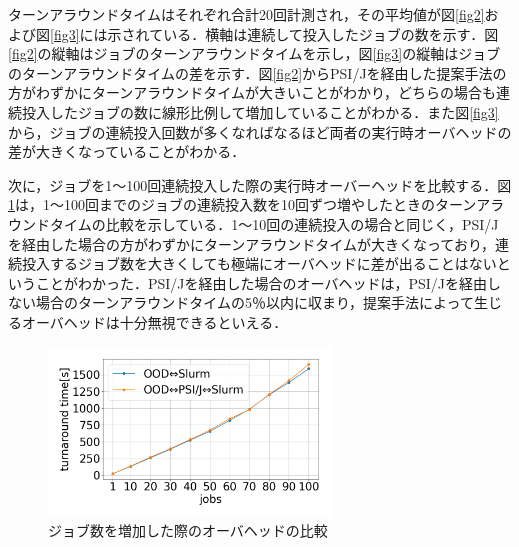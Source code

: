 \documentclass[a4paper,oneside,twocolumn,notitlepage,dvipdfmx]{jsarticle}
\begin{document}
\vspace{3\baselineskip}
ターンアラウンドタイムはそれぞれ合計20回計測され，その平均値が図\ref{fig2}および図\ref{fig3}には示されている．横軸は連続して投入したジョブの数を示す．図\ref{fig2}の縦軸はジョブのターンアラウンドタイムを示し，図\ref{fig3}の縦軸はジョブのターンアラウンドタイムの差を示す．図\ref{fig2}からPSI/Jを経由した提案手法の方がわずかにターンアラウンドタイムが大きいことがわかり，どちらの場合も連続投入したジョブの数に線形比例して増加していることがわかる．また図\ref{fig3}から，ジョブの連続投入回数が多くなればなるほど両者の実行時オーバヘッドの差が大きくなっていることがわかる．\par
次に，ジョブを1～100回連続投入した際の実行時オーバーヘッドを比較する．図\ref{fig5}は，1～100回までのジョブの連続投入数を10回ずつ増やしたときのターンアラウンドタイムの比較を示している．1～10回の連続投入の場合と同じく，PSI/Jを経由した場合の方がわずかにターンアラウンドタイムが大きくなっており，連続投入するジョブ数を大きくしても極端にオーバヘッドに差が出ることはないということがわかった．PSI/Jを経由した場合のオーバヘッドは，PSI/Jを経由しない場合のターンアラウンドタイムの5％以内に収まり，提案手法によって生じるオーバヘッドは十分無視できるといえる．\par

\begin{figure}[h]
  \centering
  \includegraphics[width=75mm]{./fig/100jobs.png}
  \vspace{-10pt}
  \caption{ジョブ数を増加した際のオーバヘッドの比較}
  \label{fig5}
\end{figure}

\vspace{3\baselineskip}
\end{document}

